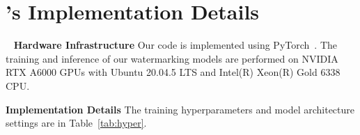 \section{\sys's Implementation Details}~\label{ap:hyper}
\textbf{Hardware Infrastructure} Our code is implemented using PyTorch~\cite{pytorch}. The training and inference of our watermarking models are performed on NVIDIA RTX A6000 GPUs with Ubuntu 20.04.5 LTS and Intel(R) Xeon(R) Gold 6338 CPU. 


\textbf{Implementation Details} The training hyperparameters and model architecture settings are in Table~\ref{tab:hyper}.

\begin{figure}[!ht]


\end{figure}

